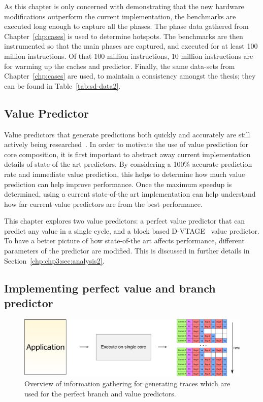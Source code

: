 As this chapter is only concerned with demonstrating that the new hardware modifications outperform the current implementation, the benchmarks are executed long enough to capture all the phases.
The phase data gathered from Chapter~\ref{chp:cases} is used to determine hotspots.
The benchmarks are then instrumented so that the main phases are captured, and executed for at least 100 million instructions.
Of that 100 million instructions, 10 million instructions are for warming up the caches and predictor.
Finally, the same data-sets from Chapter~\ref{chp:cases} are used, to maintain a consistency amongst the thesis; they can be found in Table~\ref{tab:sd-data2}.

\subsection{Value Predictor}

Value predictors that generate predictions both quickly and accurately are still actively being researched~\cite{peraisVTAGE2014,peraisBeBop2015,sheikh2017value}.
In order to motivate the use of value prediction for core composition, it is first important to abstract away current implementation details of state of the art predictors.
By considering a 100\% accurate prediction rate and immediate value prediction, this helps to determine how much value prediction can help improve performance.
Once the maximum speedup is determined, using a current state-of-the art implementation can help understand how far current value predictors are from the best performance.

This chapter explores two value predictors: a perfect value predictor that can predict any value in a single cycle, and a block based D-VTAGE~\cite{peraisBeBop2015} value predictor.
To have a better picture of how state-of-the art affects performance, different parameters of the predictor are modified.
This is discussed in further details in Section~\ref{chp:chp3:sec:analysis2}.

\subsection{Implementing perfect value and branch predictor}

\begin{figure}[t]
    \centering
    \includegraphics[width=1\textwidth]{chapter3/graphics/trace-gen.pdf}

    \caption{Overview of information gathering for generating traces which are used for the perfect branch and value predictors.}
    \label{fig:trace-gen}
\end{figure}

